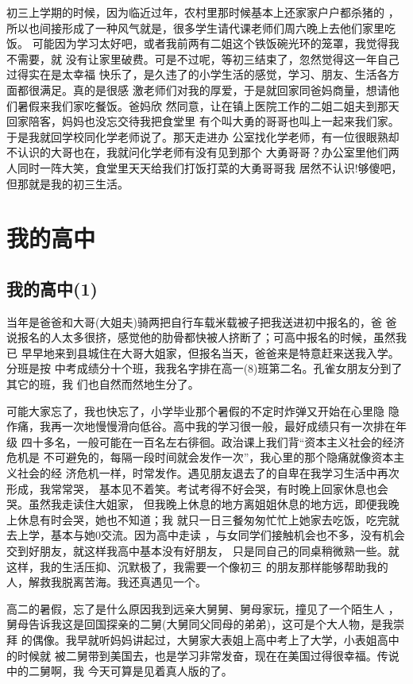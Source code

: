 \documentclass[12pt]{book}
\begin{document}
        初三上学期的时候，因为临近过年，农村里那时候基本上还家家户户都杀猪的
，所以也间接形成了一种风气就是，很多学生请代课老师们周六晚上去他们家里吃饭。
可能因为学习太好吧，或者我前两有二姐这个铁饭碗光环的笼罩，我觉得我不需要，就
没有让家里破费。可是不过呢，等初三结束了，忽然觉得这一年自己过得实在是太幸福
快乐了，是久违了的小学生活的感觉，学习、朋友、生活各方面都很满足。真的是很感
激老师们对我的厚爱，于是就回家同爸妈商量，想请他们暑假来我们家吃餐饭。爸妈欣
然同意，让在镇上医院工作的二姐二姐夫到那天回家陪客，妈妈也没忘交待我把食堂里
有个叫大勇的哥哥也叫上一起来我们家。于是我就回学校同化学老师说了。那天走进办
公室找化学老师，有一位很眼熟却不认识的大哥也在，我就问化学老师有没有见到那个
大勇哥哥？办公室里他们两人同时一阵大笑，食堂里天天给我们打饭打菜的大勇哥哥我
居然不认识!够傻吧，但那就是我的初三生活。

\chapter{我的高中}
\label{sec-3}
\section{我的高中(1)}
\label{sec-3-1}

        当年是爸爸和大哥(大姐夫)骑两把自行车载米载被子把我送进初中报名的，爸
爸说报名的人太多很挤，感觉他的肋骨都快被人挤断了；可高中报名的时候，虽然我已
早早地来到县城住在大哥大姐家，但报名当天，爸爸来是特意赶来送我入学。分班是按
中考成绩分十个班，我我名字排在高一(8)班第二名。孔雀女朋友分到了其它的班，我
们也自然而然地生分了。

        可能大家忘了，我也快忘了，小学毕业那个暑假的不定时炸弹又开始在心里隐
隐作痛，我再一次地慢慢滑向低谷。高中我的学习很一般，最好成绩只有一次排在年级
四十多名，一般可能在一百名左右徘徊。政治课上我们背“资本主义社会的经济危机是
不可避免的，每隔一段时间就会发作一次”，我心里的那个隐痛就像资本主义社会的经
济危机一样，时常发作。遇见朋友退去了的自卑在我学习生活中再次形成，我常常哭，
基本见不着笑。考试考得不好会哭，有时晚上回家休息也会哭。虽然我走读住大姐家，
但我晚上休息的地方离姐姐休息的地方远，即便我晚上休息有时会哭，她也不知道；我
就只一日三餐匆匆忙忙上她家去吃饭，吃完就去上学，基本与她0交流。因为高中走读
，与女同学们接触机会也不多，没有机会交到好朋友，就这样我高中基本没有好朋友，
只是同自己的同桌稍微熟一些。就这样，我的生活压抑、沉默极了，我需要一个像初三
的朋友那样能够帮助我的人，解救我脱离苦海。我还真遇见一个。

        高二的暑假，忘了是什么原因我到远亲大舅舅、舅母家玩，撞见了一个陌生人
，舅母告诉我这是回国探亲的二舅(大舅同父同母的弟弟)，这可是个大人物，是我崇拜
的偶像。我早就听妈妈讲起过，大舅家大表姐上高中考上了大学，小表姐高中的时候就
被二舅带到美国去，也是学习非常发奋，现在在美国过得很幸福。传说中的二舅啊，我
今天可算是见着真人版的了。
\end{document}
